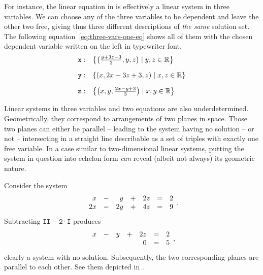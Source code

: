For instance, the linear equation in  is effectively a
linear system in three variables. We can choose any of the three variables to be
dependent and leave the other two free, giving thus three different descriptions
of \emph{the same} solution set. The following
equation~\eqref{eq:three-vars-one-eq} shows all of them with the chosen
dependent variable written on the left in typewriter font.
\begin{equation}
 \label{eq:three-vars-one-eq}
 \begin{array}{r l}
  \mathtt{x:} & \left\{ \left( \frac{y + 3z - 3}{2}, y, z \right) \mid y,z \in \mathbb{R}
  \right\}\\[1em]
  \mathtt{y:} & \left\{ \left( x, 2x - 3z + 3, z \right) \mid x,z \in \mathbb{R}
  \right\}\\[1em]
   \mathtt{z:} & \left\{ \left( x, y, \frac{2x - y + 3}{3} \right) \mid x,y \in
   \mathbb{R} \right\}
 \end{array}
\end{equation}

Linear systems in three variables and two equations are also underdetermined.
Geometrically, they correspond to arrangements of two planes in space. Those two
planes can either be parallel -- leading to the system having no solution -- or
not -- intersecting in a straight line describable as a set of triples with
exactly one free variable. In a case similar to two-dimensional linear systems,
putting the system in question into echelon form \emph{can} reveal (albeit not
always) its geometric nature.

Consider the system
\begin{equation}
 \label{eq:two-parallel-planes}
 \begin{array}{r c r c r c r}
  x & - & y & + & 2z & = & 2\\
  2x & - & 2y & + & 4z & = & 9
 \end{array}.
\end{equation}
Subtracting $\mathtt{II - 2 \cdot I}$ produces
\[
 \begin{array}{r c r c r c r}
  x & - & y & + & 2z & = & 2\\
    &   &   &   &  0 & = & 5
 \end{array},
\]
clearly a system with no solution. Subsequently, the two corresponding planes
are parallel to each other. See them depicted in
.

